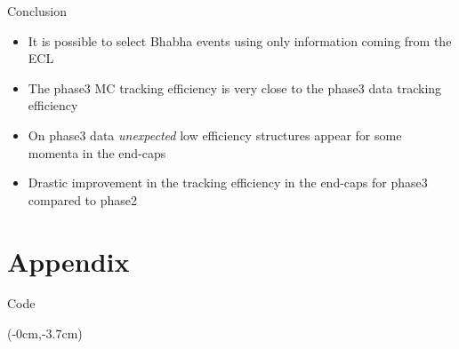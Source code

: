 \documentclass[8pt]{beamer}
\begin{document}
\begin{frame}{Conclusion}
	
	
	\begin{itemize}
		\item It is possible to select Bhabha events using only information coming from the ECL
		\item The phase3 MC tracking efficiency is very close to the phase3 data tracking efficiency
		
		\item On phase3 data \textit{unexpected} low efficiency structures appear  for some momenta in the end-caps 
		\item Drastic improvement in the tracking efficiency in the end-caps for phase3 compared to phase2
	\end{itemize}
	
	
	
	
\end{frame}



\appendix
\section{Appendix}
\begin{frame}{Code}


\lstset{language=Python}
\lstset{basicstyle=\normalsize}

\begin{textblock*}{\textwidth}(-0cm,-3.7cm)
	
	
	
	
\end{textblock*}


\end{frame}
\end{document}
